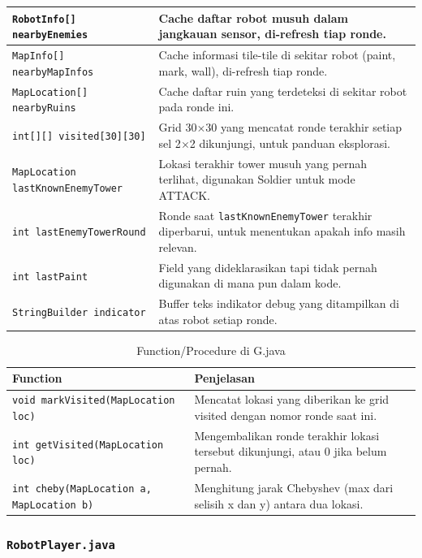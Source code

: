 \documentclass{article}
\begin{document}
\begin{enumerate}[label=\alph*.]
\begin{longtable}{|p{}|p{}|}
\hline
\texttt{RobotInfo[] nearbyEnemies} & Cache daftar robot musuh dalam jangkauan sensor, di-refresh tiap ronde. \\
\hline
\texttt{MapInfo[] nearbyMapInfos} & Cache informasi tile-tile di sekitar robot (paint, mark, wall), di-refresh tiap ronde. \\
\hline
\texttt{MapLocation[] nearbyRuins} & Cache daftar ruin yang terdeteksi di sekitar robot pada ronde ini. \\
\hline
\texttt{int[][] visited[30][30]} & Grid 30\(\times\)30 yang mencatat ronde terakhir setiap sel 2\(\times\)2 dikunjungi, untuk panduan eksplorasi. \\
\hline
\texttt{MapLocation lastKnownEnemyTower} & Lokasi terakhir tower musuh yang pernah terlihat, digunakan Soldier untuk mode ATTACK. \\
\hline
\texttt{int lastEnemyTowerRound} & Ronde saat \texttt{lastKnownEnemyTower} terakhir diperbarui, untuk menentukan apakah info masih relevan. \\
\hline
\texttt{int lastPaint} & Field yang dideklarasikan tapi tidak pernah digunakan di mana pun dalam kode. \\
\hline
\texttt{StringBuilder indicator} & Buffer teks indikator debug yang ditampilkan di atas robot setiap ronde. \\
\hline
\end{longtable}

\begin{longtable}{|p{}|p{}|}
\caption{Function/Procedure di G.java} \\
\hline
\textbf{Function} & \textbf{Penjelasan} \\
\hline
\endhead
\hline
\endfoot
\texttt{void markVisited(MapLocation loc)} & Mencatat lokasi yang diberikan ke grid visited dengan nomor ronde saat ini. \\
\hline
\texttt{int getVisited(MapLocation loc)} & Mengembalikan ronde terakhir lokasi tersebut dikunjungi, atau 0 jika belum pernah. \\
\hline
\texttt{int cheby(MapLocation a, MapLocation b)} & Menghitung jarak Chebyshev (max dari selisih x dan y) antara dua lokasi. \\
\hline
\end{longtable}

\subsubsection{\lstinline|RobotPlayer.java|}


\end{enumerate}
\end{document}
